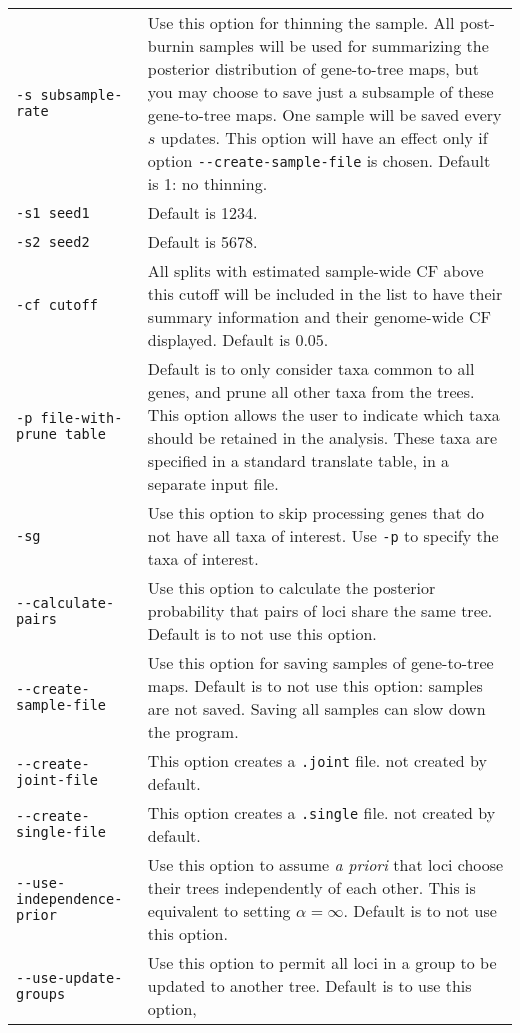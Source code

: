 \documentclass[12pt,english,final,letterpaper]{article}
\begin{document}
\noindent
\hspace*{-.3in}
\begin{tabular}{l|p{4.4in}}
{\tt -s subsample-rate}&Use this option for thinning the sample. All post-burnin samples
will be used for summarizing the posterior distribution of gene-to-tree maps, 
but you may choose to save just a subsample of these gene-to-tree maps. One sample
will be saved every $s$ updates. This option will have an effect only if option
\verb+--create-sample-file+ is chosen. Default is 1: no thinning.\\
{\tt -s1 seed1}&Default is 1234. %
\\
{\tt -s2 seed2}&Default is 5678.\\
{\tt -cf cutoff}&All splits with estimated sample-wide CF above this cutoff 
will be included in the list to have their summary information and their genome-wide CF
displayed. Default is $0.05$.\\
{\tt -p file-with-prune table}& Default is to only consider taxa common to all genes, and prune all other taxa from the trees. This option allows the user to indicate which taxa should be retained in the analysis. These taxa are specified in a standard translate table, in a separate input file.\\
{\tt -sg}& Use this option to skip processing genes that do not have all taxa of interest.
Use {\tt -p} to specify the taxa of interest. \\
\verb+--calculate-pairs+&Use this option to calculate the 
posterior probability that pairs of loci share the same tree. Default is 
to {\sc not} use this option.\\
\verb+--create-sample-file+&Use this option for saving samples of gene-to-tree maps.
Default is to {\sc not} use this option: samples are not saved. Saving all samples can slow down the program.\\
\verb+--create-joint-file+&This option creates a {\tt .joint} file. 
{\sc not} created by default.\\
\verb+--create-single-file+&This option creates a {\tt .single} file. 
{\sc not} created by default. \\
\verb+--use-independence-prior+&Use this option to assume {\it a priori}
that loci choose their trees independently of each other. This is equivalent
to setting $\alpha=\infty$. Default is to {\sc not} use this option.\\
\verb+--use-update-groups+&Use this option to permit all loci 
in a group to be updated to another tree. Default is to use this option,

\end{tabular}
\end{document}
